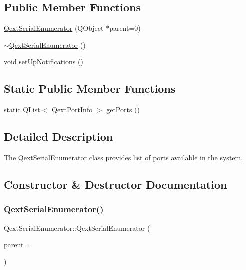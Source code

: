 \subsection*{Public Member Functions}
\begin{DoxyCompactItemize}
\item 
\hyperlink{classQextSerialEnumerator_a3c6f9fc4b5835d63197caa424dc6703e}{Qext\+Serial\+Enumerator} (Q\+Object $\ast$parent=0)
\item 
\hyperlink{classQextSerialEnumerator_ae4d0507728ffb990606ff8dde3da6e6d}{$\sim$\+Qext\+Serial\+Enumerator} ()
\item 
void \hyperlink{classQextSerialEnumerator_a5a8caf21f4ad519323f13219651274ec}{set\+Up\+Notifications} ()
\end{DoxyCompactItemize}
\subsection*{Static Public Member Functions}
\begin{DoxyCompactItemize}
\item 
static Q\+List$<$ \hyperlink{structQextPortInfo}{Qext\+Port\+Info} $>$ \hyperlink{classQextSerialEnumerator_a7b0e5f76259ae0651ea23763decc2642}{get\+Ports} ()
\end{DoxyCompactItemize}


\subsection{Detailed Description}
The \hyperlink{classQextSerialEnumerator}{Qext\+Serial\+Enumerator} class provides list of ports available in the system. 



\subsection{Constructor \& Destructor Documentation}
\mbox{\label{classQextSerialEnumerator_a3c6f9fc4b5835d63197caa424dc6703e}} 
\subsubsection{\texorpdfstring{Qext\+Serial\+Enumerator()}{QextSerialEnumerator()}}
{\footnotesize\ttfamily Qext\+Serial\+Enumerator\+::\+Qext\+Serial\+Enumerator (\begin{DoxyParamCaption}\item[{Q\+Object $\ast$}]{parent = {} }\end{DoxyParamCaption})}


